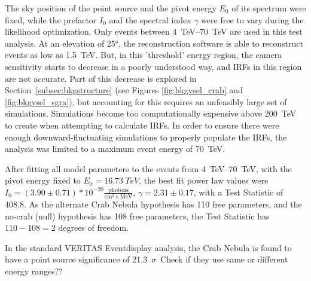  The sky position of the point source and the pivot energy $E_{0}$ of its spectrum were fixed, while the prefactor $I_{0}$ and the spectral index $\gamma$ were free to vary during the likelihood optimization.
  Only events between \SIrange{4}{70}{TeV} are used in this test analysis.
  At an elevation of \ang{25}, the reconstruction software is able to reconstruct events as low as \SI{1.5}{TeV}.
  But, in this 'threshold' energy region, the camera sensitivity starts to decrease in a poorly understood way, and IRFs in this region are not accurate.
  Part of this decrease is explored in Section~\ref{subsec:bkgstructure} (see Figures \ref{fig:bkgvsel_crab} and \ref{fig:bkgvsel_sgra}), but accounting for this requires an unfeasibly large set of simulations.
  Simulations become too computationally expensive above \SI{200}{TeV} to create when attempting to calculate IRFs.
  In order to ensure there were enough downward-fluctuating simulations to properly populate the IRFs, the analysis was limited to a maximum event energy of \SI{70}{TeV}.
    
  After fitting all model parameters to the events from \SIrange{4}{70}{TeV}, with the pivot energy fixed to $ E_{0}= \SI{16.73}{TeV} $, the best fit power law values were $ I_{0} = \left(3.90\pm0.71\right)*10^{-20} \frac{\textrm{photons}}{\textrm{cm}^{2} \; \textrm{s} \; \textrm{MeV} } $, $ \gamma = 2.31 \pm 0.17 $, with a Test Statistic of 408.8.
  As the alternate Crab Nebula hypothesis has 110 free parameters, and the no-crab (null) hypothesis has 108 free parameters, the Test Statistic has $ 110 - 108 = 2 $ degrees of freedom.
  
  In the standard VERITAS Eventdisplay analysis, the Crab Nebula is found to have a point source significance of \SI{21.3}{$\sigma$}.
  {\color{red}Check if they use same or different energy ranges??}
    
